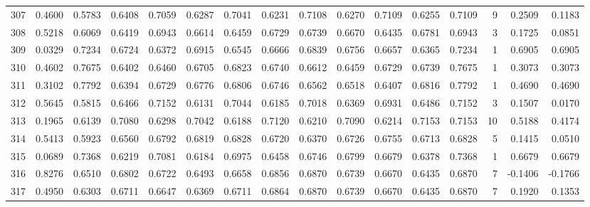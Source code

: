 \begin{tabular}{lrrrrrrrrrrrrrrr}
307 &      0.4600 &  0.5783 &  0.6408 &  0.7059 &  0.6287 &  0.7041 &  0.6231 &  0.7108 &  0.6270 &  0.7109 &   0.6255 &     0.7109 &      9 &                    0.2509 &                     0.1183 \\
308 &      0.5218 &  0.6069 &  0.6419 &  0.6943 &  0.6614 &  0.6459 &  0.6729 &  0.6739 &  0.6670 &  0.6435 &   0.6781 &     0.6943 &      3 &                    0.1725 &                     0.0851 \\
309 &      0.0329 &  0.7234 &  0.6724 &  0.6372 &  0.6915 &  0.6545 &  0.6666 &  0.6839 &  0.6756 &  0.6657 &   0.6365 &     0.7234 &      1 &                    0.6905 &                     0.6905 \\
310 &      0.4602 &  0.7675 &  0.6402 &  0.6460 &  0.6705 &  0.6823 &  0.6740 &  0.6612 &  0.6459 &  0.6729 &   0.6739 &     0.7675 &      1 &                    0.3073 &                     0.3073 \\
311 &      0.3102 &  0.7792 &  0.6394 &  0.6729 &  0.6776 &  0.6806 &  0.6746 &  0.6562 &  0.6518 &  0.6407 &   0.6816 &     0.7792 &      1 &                    0.4690 &                     0.4690 \\
312 &      0.5645 &  0.5815 &  0.6466 &  0.7152 &  0.6131 &  0.7044 &  0.6185 &  0.7018 &  0.6369 &  0.6931 &   0.6486 &     0.7152 &      3 &                    0.1507 &                     0.0170 \\
313 &      0.1965 &  0.6139 &  0.7080 &  0.6298 &  0.7042 &  0.6188 &  0.7120 &  0.6210 &  0.7090 &  0.6214 &   0.7153 &     0.7153 &     10 &                    0.5188 &                     0.4174 \\
314 &      0.5413 &  0.5923 &  0.6560 &  0.6792 &  0.6819 &  0.6828 &  0.6720 &  0.6370 &  0.6726 &  0.6755 &   0.6713 &     0.6828 &      5 &                    0.1415 &                     0.0510 \\
315 &      0.0689 &  0.7368 &  0.6219 &  0.7081 &  0.6184 &  0.6975 &  0.6458 &  0.6746 &  0.6799 &  0.6679 &   0.6378 &     0.7368 &      1 &                    0.6679 &                     0.6679 \\
316 &      0.8276 &  0.6510 &  0.6802 &  0.6722 &  0.6493 &  0.6658 &  0.6856 &  0.6870 &  0.6739 &  0.6670 &   0.6435 &     0.6870 &      7 &                   -0.1406 &                    -0.1766 \\
317 &      0.4950 &  0.6303 &  0.6711 &  0.6647 &  0.6369 &  0.6711 &  0.6864 &  0.6870 &  0.6739 &  0.6670 &   0.6435 &     0.6870 &      7 &                    0.1920 &                     0.1353 \\

\end{tabular}
